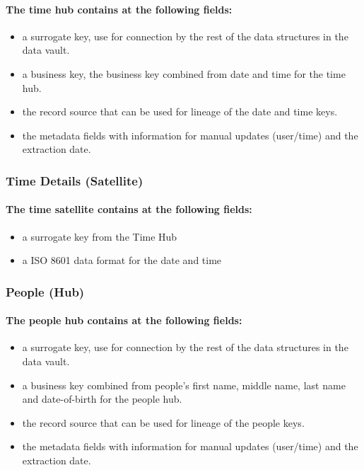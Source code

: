\paragraph{The time hub contains at the following fields:}
\begin{itemize}
  \item{a surrogate key, use for connection by the rest of the data structures in the data vault.}
  \item{a business key, the business key combined from date and time for the time hub.}
  \item{the record source that can be used for lineage of the date and time keys.}
  \item{the metadata fields with information for manual updates (user/time) and the extraction date.}
\end{itemize}
\subsubsection{Time Details (Satellite)}
\paragraph{The time satellite contains at the following fields:}
\begin{itemize}
\item{a surrogate key from the Time Hub}
\item{a ISO 8601 data format for the date and time}
\end{itemize}
\subsubsection{People (Hub)}
\paragraph{The people hub contains at the following fields:}
\begin{itemize}
  \item{a surrogate key, use for connection by the rest of the data structures in the data vault.}
  \item{a business key combined from people's first name, middle name, last name and date-of-birth for the people hub.}
  \item{the record source that can be used for lineage of the people keys.}
  \item{the metadata fields with information for manual updates (user/time) and the extraction date.}
\end{itemize}
